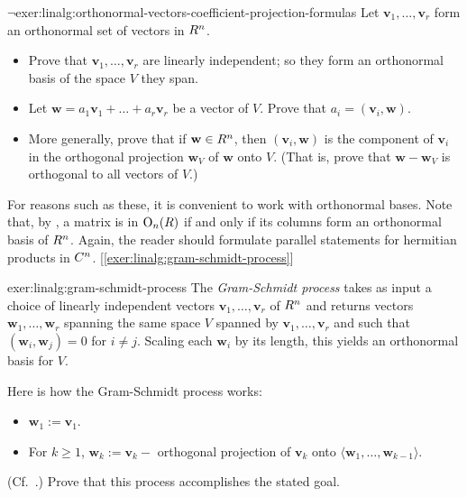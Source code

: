\begin{exer}{$\lnot$}{exer:linalg:orthonormal-vectors-coefficient-projection-formulas}
  Let $\mathbf{v}_1, \dots, \mathbf{v}_r$ form an orthonormal set of
  vectors in $R^n$.
  \begin{itemize}
  \item Prove that $\mathbf{v}_1, \dots, \mathbf{v}_r$ are linearly
    independent; so they form an orthonormal basis of the space $V$
    they span.
  \item Let $\mathbf{w} = a_1\mathbf{v}_1 + \dots + a_r\mathbf{v}_r$
    be a vector of $V$. Prove that $a_i = (\mathbf{v}_i, \mathbf{w})$.
  \item More generally, prove that if $\mathbf{w} \in R^n$, then
    $(\mathbf{v}_i, \mathbf{w})$ is the component of $\mathbf{v}_i$ in
    the orthogonal projection $\mathbf{w}_V$ of $\mathbf{w}$ onto $V$.
    (That is, prove that $\mathbf{w} - \mathbf{w}_V$ is orthogonal to
    all vectors of $V$.)
  \end{itemize}
  \begin{center}
  \end{center}
  For reasons such as these, it is convenient to work with orthonormal
  bases. Note that, by
  , a matrix is in
  $\mathrm{O}_n(R)$ if and only if its columns form an orthonormal
  basis of $R^n$. Again, the reader should formulate parallel
  statements for hermitian products in
  $C^n$. [\ref{exer:linalg:gram-schmidt-process}]
\end{exer}
\begin{exer}{}{exer:linalg:gram-schmidt-process}
  The \emph{Gram-Schmidt process} takes as input a choice of linearly
  independent vectors $\mathbf{v}_1, \dots, \mathbf{v}_r$ of $R^n$
  and returns vectors $\mathbf{w}_1, \dots, \mathbf{w}_r$ spanning the
  same space $V$ spanned by $\mathbf{v}_1, \dots, \mathbf{v}_r$ and
  such that $(\mathbf{w}_i, \mathbf{w}_j) = 0$ for $i \neq j$. Scaling
  each $\mathbf{w}_i$ by its length, this yields an orthonormal basis
  for $V$.

  Here is how the Gram-Schmidt process works:
  \begin{itemize}
  \item[---] $\mathbf{w}_1 := \mathbf{v}_1$.
  \item[---] For $k \geq 1$, $\mathbf{w}_k := \mathbf{v}_k -$
    orthogonal projection of $\mathbf{v}_k$ onto
    $\langle \mathbf{w}_1, \dots, \mathbf{w}_{k-1} \rangle$.
  \end{itemize}
  (Cf.\
  .)
  Prove that this process accomplishes the stated goal.
\end{exer}
